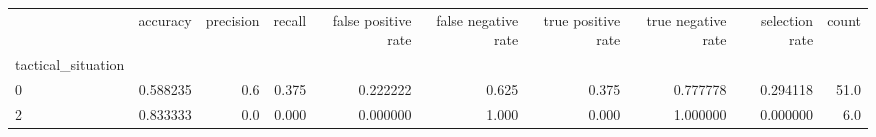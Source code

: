 \begin{tabular}{lrrrrrrrrr}
\toprule
{} &  accuracy &  precision &  recall &  false positive rate &  false negative rate &  true positive rate &  true negative rate &  selection rate &  count \\
tactical\_situation &           &            &         &                      &                      &                     &                     &                 &        \\
\midrule
0                  &  0.588235 &        0.6 &   0.375 &             0.222222 &                0.625 &               0.375 &            0.777778 &        0.294118 &   51.0 \\
2                  &  0.833333 &        0.0 &   0.000 &             0.000000 &                1.000 &               0.000 &            1.000000 &        0.000000 &    6.0 \\
\bottomrule
\end{tabular}
